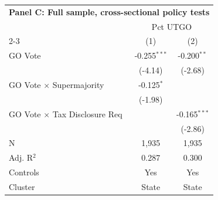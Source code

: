 \begingroup
\centering
\begin{tabular*}{\textwidth}{@{\extracolsep{\fill}}lcc}
\multicolumn{3}{l}{\textbf{Panel C: Full sample, cross-sectional policy tests}}\\

\addlinespace
   \toprule
    & \multicolumn{2}{c}{Pct UTGO}\\
   \cmidrule(lr){2-3}
                                        & (1)            & (2)\\  
   \midrule 
   GO Vote                              & -0.255$^{***}$ & -0.200$^{**}$\\   
                                        & (-4.14)       & (-2.68)\\   
   GO Vote $\times$ Supermajority       & -0.125$^{*}$   &   \\   
                                        & (-1.98)       &   \\   
   GO Vote $\times$ Tax Disclosure Req  &                & -0.165$^{***}$\\   
                                        &                & (-2.86)\\   
   \hline
   N                         & 1,935          & 1,935\\  
   Adj. R$^2$                       & 0.287          & 0.300\\  
   Controls                   & Yes            & Yes\\
   Cluster              & State & State\\  
   \bottomrule
\end{tabular*}
\par\endgroup
